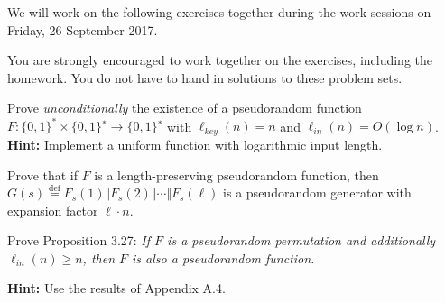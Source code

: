 \documentclass[a4paper,10pt,landscape,twocolumn]{scrartcl}
\newcommand\worksession{Friday, 26 September 2017}
\begin{document}
\problems

{\sffamily\noindent
We will work on the following exercises together during the work sessions on \worksession.

You are strongly encouraged to work together on the exercises, including the homework. You do not have to hand in solutions to these problem sets.}

\begin{exercise}
  Prove \emph{unconditionally} the existence of a pseudorandom function $F : \{0,1\}^* \times \{0,1\}^∗\to \{0,1\}^∗$ with $\ell_{key}(n)=n$ and $\ell_{in}(n)=O(\log n)$.
  \textbf{Hint:} Implement a uniform function with logarithmic input length.
\end{exercise}

\begin{exercise}
Prove that if $F$ is a length-preserving pseudorandom function, then
$G(s) \overset{\text{def}}{=} F_s(1)\Vert F_s(2)\Vert \cdots \Vert F_s(\ell)$ is a pseudorandom generator with expansion factor $\ell \cdot n$.
\end{exercise}

\begin{exercise}
  Prove Proposition 3.27:
  \textit{
If $F$ is a pseudorandom permutation and additionally $\ell_{in}(n) \geq n$, then $F$ is also a pseudorandom function.
  }
  
\textbf{Hint:} Use the results of Appendix A.4.

\end{exercise}
\end{document}
